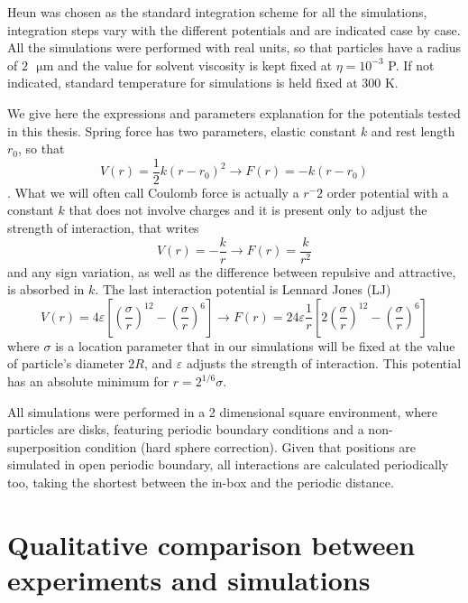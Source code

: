 \documentclass[../../master_thesis_np.tex]{subfiles}
\begin{document}
	Heun was chosen as the standard integration scheme for all the simulations, integration steps vary with the different potentials and are indicated case by case. All the simulations were performed with real units, so that particles have a radius of $2\text{ }\mathrm{\mu m}$ and the value for solvent viscosity is kept fixed at $\eta = 10^{-3}$ P. If not indicated, standard temperature for simulations is held fixed at $300$ K.
	
	We give here the expressions and parameters explanation for the potentials tested in this thesis. Spring force has two parameters, elastic constant $k$ and rest length $r_0$, so that 
	\begin{equation}
		V(r) = \frac{1}{2}k (r-r_0)^2 \rightarrow F(r) = -k(r-r_0)
	\end{equation}.
	What we will often call Coulomb force is actually a $r^-2$ order potential with a constant $k$ that does not involve charges and it is present only to adjust the strength of interaction, that writes
	\begin{equation}
		V(r) = -\frac{k}{r} \rightarrow F(r) = \frac{k}{r^2}
	\end{equation} 
	and any sign variation, as well as the difference between repulsive and attractive, is absorbed in $k$. The last interaction potential is Lennard Jones (LJ)
	\begin{equation}
		V(r) = 4\varepsilon \left[ \left(\frac{\sigma}{r}\right)^{12} - \left(\frac{\sigma}{r}\right)^{6} \right] \rightarrow F(r) = 24\varepsilon \frac{1}{r}\left[ 2 \left(\frac{\sigma}{r}\right)^{12}  - \left(\frac{\sigma}{r}\right)^{6} \right]
	\end{equation}
	where $\sigma$ is a location parameter that in our simulations will be fixed at the value of particle's diameter $2R$, and $\varepsilon$ adjusts the strength of interaction. This potential has an absolute minimum for $r = 2^{1/6}\sigma$.
	
	
	All simulations were performed in a 2 dimensional square environment, where particles are disks, featuring periodic boundary conditions and a non-superposition condition (hard sphere correction). Given that positions are simulated in open periodic boundary, all interactions are calculated periodically too, taking the shortest between the in-box and the periodic distance.
	
	\section{Qualitative comparison between experiments and simulations} \label{qualitative}
	
\end{document}
